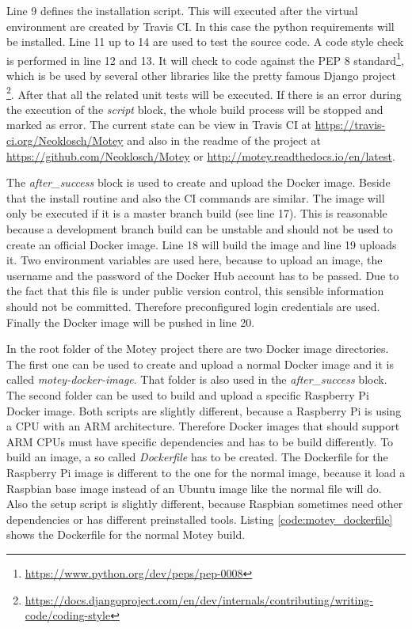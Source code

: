 Line 9 defines the installation script.
This will executed after the virtual environment are created by Travis CI.
In this case the python requirements will be installed.
Line 11 up to 14 are used to test the source code.
A code style check is performed in line 12 and 13.
It will check to code against the \ac{PEP} 8 standard\footnote{\url{https://www.python.org/dev/peps/pep-0008}}, which is be used by several other libraries like the pretty famous Django project{ \footnote{\url{https://docs.djangoproject.com/en/dev/internals/contributing/writing-code/coding-style}}}.
After that all the related unit tests will be executed.
If there is an error during the execution of the \textit{script} block, the whole build process will be stopped and marked as error.
The current state can be view in Travis CI at \url{https://travis-ci.org/Neoklosch/Motey} and also in the readme of the project at \url{https://github.com/Neoklosch/Motey} or \url{http://motey.readthedocs.io/en/latest}.\newline

The \textit{after\_success} block is used to create and upload the Docker image.
Beside that the install routine and also the \ac{CI} commands are similar.
The image will only be executed if it is a master branch build (see line 17).
This is reasonable because a development branch build can be unstable and should not be used to create an official Docker image.
Line 18 will build the image and line 19 uploads it.
Two environment variables are used here, because to upload an image, the username and the password of the Docker Hub account has to be passed.
Due to the fact that this file is under public version control, this sensible information should not be committed.
Therefore preconfigured login credentials are used.
Finally the Docker image will be pushed in line 20.\newline

In the root folder of the Motey project there are two Docker image directories.
The first one can be used to create and upload a normal Docker image and it is called \textit{motey-docker-image}.
That folder is also used in the \textit{after\_success} block.
The second folder can be used to build and upload a specific Raspberry Pi Docker image.
Both scripts are slightly different, because a Raspberry Pi is using a \ac{CPU} with an ARM architecture.
Therefore Docker images that should support ARM \acp{CPU} must have specific dependencies and has to be build differently.
To build an image, a so called \textit{Dockerfile} has to be created.
The Dockerfile for the Raspberry Pi image is different to the one for the normal image, because it load a Raspbian base image instead of an Ubuntu image like the normal file will do.
Also the setup script is slightly different, because Raspbian sometimes need other dependencies or has different preinstalled tools.
Listing \ref{code:motey_dockerfile} shows the Dockerfile for the normal Motey build.\newline

